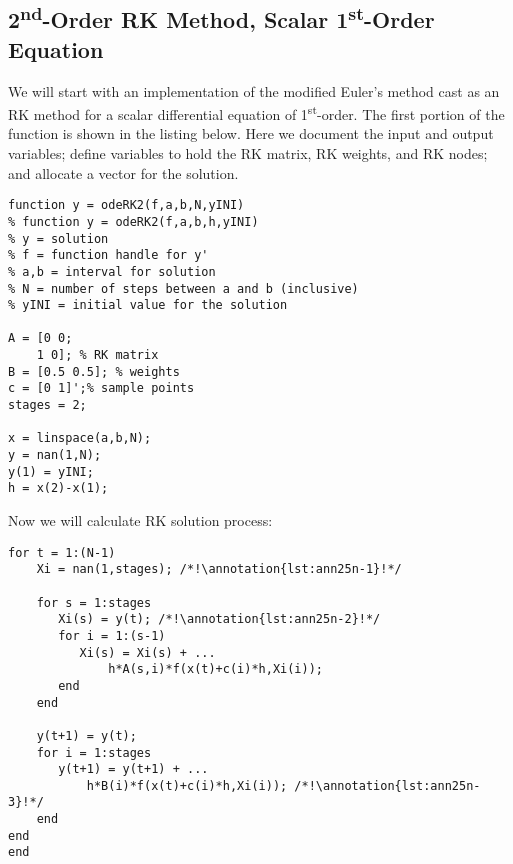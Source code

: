 \subsection{2\textsuperscript{nd}-Order RK Method, Scalar 1\textsuperscript{st}-Order Equation}
We will start with an implementation of the modified Euler's method cast as an RK method for a scalar differential equation of 1\textsuperscript{st}-order.  The first portion of the function is shown in the listing below. Here we document the input and output variables; define variables to hold the RK matrix, RK weights, and RK nodes; and allocate a vector for the solution.

\begin{lstlisting}[style=myMatlab,name=lec25n-1]
function y = odeRK2(f,a,b,N,yINI)
% function y = odeRK2(f,a,b,h,yINI)
% y = solution
% f = function handle for y'
% a,b = interval for solution
% N = number of steps between a and b (inclusive)
% yINI = initial value for the solution

A = [0 0;
    1 0]; % RK matrix
B = [0.5 0.5]; % weights
c = [0 1]';% sample points
stages = 2;

x = linspace(a,b,N);
y = nan(1,N);
y(1) = yINI;
h = x(2)-x(1);
\end{lstlisting}

\noindent Now we will calculate RK solution process:
\begin{lstlisting}[style=myMatlab,name=lec25n-1]
for t = 1:(N-1)
    Xi = nan(1,stages); /*!\annotation{lst:ann25n-1}!*/
    
    for s = 1:stages
       Xi(s) = y(t); /*!\annotation{lst:ann25n-2}!*/
       for i = 1:(s-1)
          Xi(s) = Xi(s) + ...
              h*A(s,i)*f(x(t)+c(i)*h,Xi(i)); 
       end
    end
    
    y(t+1) = y(t);
    for i = 1:stages
       y(t+1) = y(t+1) + ...
           h*B(i)*f(x(t)+c(i)*h,Xi(i)); /*!\annotation{lst:ann25n-3}!*/
    end    
end
end
\end{lstlisting}

